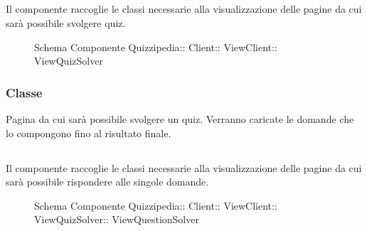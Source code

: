 \subsection{}
Il componente raccoglie le classi necessarie alla visualizzazione delle pagine da cui sarà possibile svolgere quiz.
\begin{figure}[H]
\centering
\noindent{}
\caption[Schema Componente ViewQuizSolver]{Schema Componente Quizzipedia:: Client:: ViewClient:: ViewQuizSolver}
\end{figure}
\subsubsection{Classe }
Pagina da cui sarà possibile svolgere un quiz. Verranno caricate le domande che lo compongono fino al risultato finale.
\begin{itemize}
\end{itemize}
\subsection{}
Il componente raccoglie le classi necessarie alla visualizzazione delle pagine da cui sarà possibile rispondere alle singole domande.
\begin{figure}[H]
\centering
\noindent{}
\caption[Schema Componente ViewQuestionSolver]{Schema Componente Quizzipedia:: Client:: ViewClient:: ViewQuizSolver:: ViewQuestionSolver}
\end{figure}
